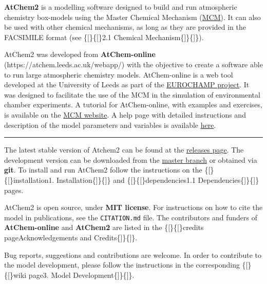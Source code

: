 \textbf{AtChem2} is a modelling software designed to build and run
atmospheric chemistry box-models using the Master Chemical Mechanism
(\href{http://mcm.leeds.ac.uk/MCM/}{MCM}). It can also be used with
other chemical mechanisms, as long as they are provided in the FACSIMILE
format (see \{{[}\}\{{[}\}2.1 Chemical Mechanism\{{]}\}\{{]}\}).

AtChem2 was developed from \textbf{AtChem-online}
(https://atchem.leeds.ac.uk/webapp/) with the objective to create a
software able to run large atmospheric chemistry models. AtChem-online
is a web tool developed at the University of Leeds as part of the
\href{https://www.eurochamp.org/}{EUROCHAMP project}. It was designed to
facilitate the use of the MCM in the simulation of environmental chamber
experiments. A tutorial for AtChem-online, with examples and exercises,
is available on the
\href{http://mcm.leeds.ac.uk/MCMv3.3.1/atchem/tutorial_intro.htt}{MCM
website}. A help page with detailed instructions and description of the
model parameters and variables is available
\href{https://atchem.leeds.ac.uk/webapp/run/help.html}{here}.

\begin{center}\rule{0.5\linewidth}{\linethickness}\end{center}

The latest stable version of Atchem2 can be found at the
\href{https://github.com/AtChem/AtChem2/releases}{releases page}. The
development version can be downloaded from the
\href{https://github.com/AtChem/AtChem2/archive/master.zip}{master
branch} or obtained via \textbf{git}. To install and run AtChem2 follow
the instructions on the \{{[}\}\{{[}\}installation\textbar{}1.
Installation\{{]}\}\{{]}\} and \{{[}\}\{{[}\}dependencies\textbar{}1.1
Dependencies\{{]}\}\{{]}\} pages.

AtChem2 is open source, under \textbf{MIT license}. For instructions on
how to cite the model in publications, see the \texttt{CITATION.md}
file. The contributors and funders of \textbf{AtChem-online} and
\textbf{AtChem2} are listed in the \{{[}\}\{{[}\}credits
page\textbar{}Acknowledgements and Credits\{{]}\}\{{]}\}.

Bug reports, suggestions and contributions are welcome. In order to
contribute to the model development, please follow the instructions in
the corresponding \{{[}\}\{{[}\}wiki page\textbar{}3. Model
Development\{{]}\}\{{]}\}.
